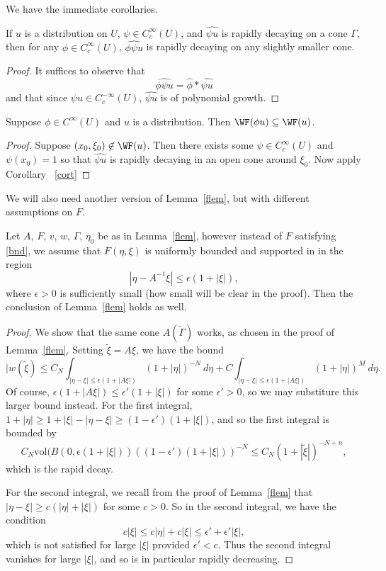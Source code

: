 \documentclass[12pt]{article}
\begin{document}
We have the immediate corollaries.
\begin{cor}\label{cort}If $u$ is a distribution on $U$, $\psi \in C_c^\infty(U)$, and $\widehat{\psi u}$ is rapidly decaying on a cone $\Gamma$, then for any $\phi \in C_c^\infty(U)$, $\widehat{\phi\psi u}$ is rapidly decaying on any slightly smaller cone. \end{cor}
\begin{proof}It suffices to observe that
\[\widehat{\phi\psi u} = \widehat{\phi}\ast\widehat{\psi u}\] and that since $\psi u \in C^{-\infty}_c(U)$, $\widehat{\psi u}$ is of polynomial growth.\end{proof}

\begin{cor}\label{cortt}Suppose $\phi \in C^\infty(U)$ and $u$ is a distribution. Then $\WF(\phi u) \subseteq \WF(u)$.\end{cor}
\begin{proof}Suppose $(x_0,\xi_0) \not \in \WF(u)$. Then there exists some $\psi \in C_c^\infty(U)$ and $\psi(x_0) = 1$ so that $\widehat{\psi u}$ is rapidly decaying in an open cone around $\xi_0$. Now apply Corollary~ \ref{cort}\end{proof}

We will also need another version of Lemma~\ref{flem}, but with different assumptions on $F$.
\begin{lem}\label{flemt}Let $A$, $F$, $v$, $w$, $\Gamma$, $\eta_0$ be as in Lemma~\ref{flem}, however instead of $F$ satisfying \eqref{bnd}, we assume that $F(\eta,\xi)$ is uniformly bounded and supported in in the region
\[|\eta-A^{-1}\xi| \leq \epsilon(1+|\xi|),\]
where $\epsilon > 0$ is sufficiently small (how small will be clear in the proof). Then the conclusion of Lemma~\ref{flem} holds as well.\end{lem}
\begin{proof}
We show that the same cone $A(\tilde{\Gamma})$ works, as chosen in the proof of Lemma~\ref{flem}. Setting $\tilde{\xi} = A\xi$, we have the bound
\[|w(\tilde{\xi}) \leq C_N\int_{|\eta-\xi| \leq \epsilon(1+|A\xi|)}(1+|\eta|)^{-N}\ d\eta + C\int_{|\eta-\xi| \leq \epsilon(1+|A\xi|)} (1+|\eta|)^M\ d\eta.\]
Of course, $\epsilon(1+|A\xi|) \leq \epsilon'(1+|\xi|)$ for some $\epsilon' > 0$, so we may substiture this larger bound instead. For the first integral, $1+|\eta| \geq 1+ |\xi|-|\eta-\xi| \geq (1-\epsilon')(1+|\xi|)$, and so the first integral is bounded by
\[C_N\text{vol}(B(0,\epsilon(1+|\xi|))((1-\epsilon')(1+|\xi|))^{-N} \leq C_N(1+|\tilde{\xi}|)^{-N+n},\]
which is the rapid decay.

For the second integral, we recall from the proof of Lemma~\ref{flem} that 
$|\eta-\xi| \geq c(|\eta| + |\xi|)$ for some $c > 0$. So in the second integral, we have the condition
\[c|\xi| \leq c|\eta| + c|\xi| \leq \epsilon' + \epsilon'|\xi|,\]
which is not satisfied for large $|\xi|$ provided $\epsilon' < c$. Thus the second integral vanishes for large $|\xi|$, and so is in particular rapidly decreasing.
\end{proof}
\end{document}
